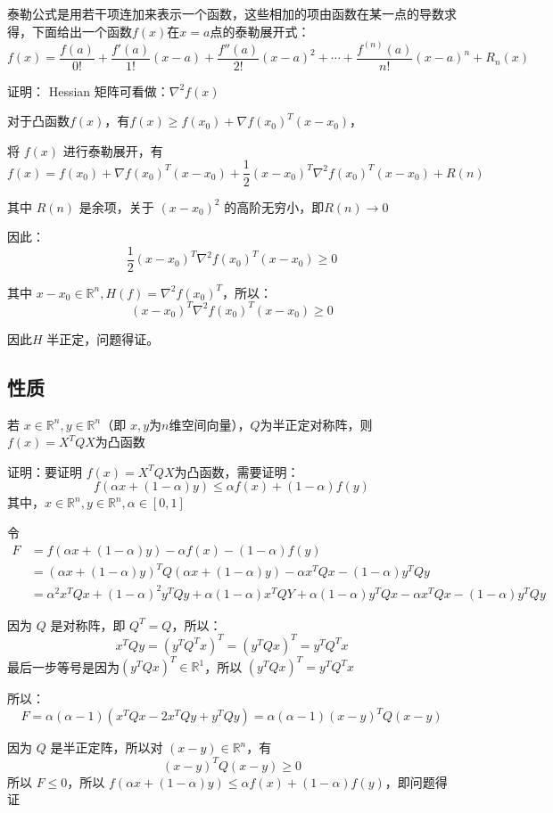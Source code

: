 \documentclass[12pt]{article}
\begin{document}
泰勒公式是用若干项连加来表示一个函数，这些相加的项由函数在某一点的导数求得，下面给出一个函数$f(x)$在$x=a$点的泰勒展开式：
$$
f(x) = \frac{f(a)}{0!} + \frac{f'(a)}{1!}(x-a) + \frac{f''(a)}{2!}(x-a)^2 + \cdots + \frac{f^{(n)}(a)}{n!}(x-a)^n + R_n(x)
$$

\begin{framed}  
\small{
证明：
Hessian 矩阵可看做：$\nabla^2f(x)$

对于凸函数$f(x)$，有$f(x) \ge f(x_0) + \nabla f(x_0)^T(x-x_0)$，

将 $f(x)$ 进行泰勒展开，有
$$
f(x) = f(x_0) + \nabla f(x_0)^T(x-x_0) + \frac{1}{2}(x-x_0)^T\nabla^2f(x_0)^T(x-x_0) + R(n)
$$

其中 $R(n)$ 是余项，关于 $(x-x_0)^2$ 的高阶无穷小，即$R(n) \to 0$

因此：
$$
\frac{1}{2}(x-x_0)^T\nabla^2f(x_0)^T(x-x_0) \ge 0
$$

其中 $x-x_0 \in \mathbb{R}^n, H(f) = \nabla^2f(x_0)^T$，所以：
$$
(x-x_0)^T\nabla^2f(x_0)^T(x-x_0) \ge 0
$$

因此$H$ 半正定，问题得证。
}
\end{framed}

\subsection{性质}
若 $x \in \mathbb{R}^n, y \in \mathbb{R}^n$（即 $x,y$为$n$维空间向量），$Q$为半正定对称阵，则 $f(x) = X^TQX$为凸函数
\begin{framed}  
\small{
证明：要证明 $f(x) = X^TQX$为凸函数，需要证明：
$$
f(\alpha x + (1-\alpha)y) \le \alpha f(x) + (1-\alpha)f(y)
$$
其中，$x\in \mathbb{R}^n, y\in \mathbb{R}^n, \alpha \in [0,1]$

令
\begin{align*}
F &= f(\alpha x + (1-\alpha)y) - \alpha f(x) - (1-\alpha)f(y)  \\
  &= (\alpha x + (1-\alpha)y)^TQ(\alpha x + (1-\alpha)y) - \alpha x^TQx - (1-\alpha)y^TQy \\
  &= \alpha^2x^TQx + (1-\alpha)^2y^TQy + \alpha(1-\alpha)x^TQY + \alpha(1-\alpha)y^TQx - \alpha x^TQx - (1-\alpha)y^TQy
\end{align*}

因为 $Q$ 是对称阵，即 $Q^T = Q$，所以：
$$
x^TQy = (y^TQ^Tx)^T = (y^TQx)^T = y^TQ^Tx 
$$
最后一步等号是因为$(y^TQx)^T \in \mathbb{R}^1$，所以 $(y^TQx)^T = y^TQ^Tx$


所以：
$$
F = \alpha(\alpha-1)(x^TQx - 2x^TQy + y^TQy) = \alpha(\alpha-1)(x-y)^TQ(x-y)
$$

因为 $Q$ 是半正定阵，所以对 $(x-y) \in \mathbb{R}^n$，有
$$
(x-y)^TQ(x-y) \ge 0
$$
所以 $F \le 0$，所以 $f(\alpha x + (1-\alpha)y) \le \alpha f(x) + (1-\alpha)f(y)$，即问题得证
}
\end{framed}
\end{document}
